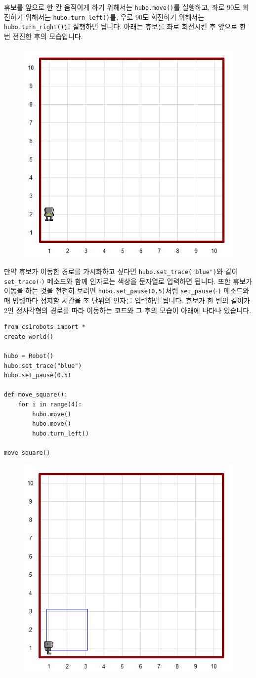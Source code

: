 \documentclass[../main.tex]{subfiles}
\begin{document}
휴보를 앞으로 한 칸 움직이게 하기 위해서는 \texttt{hubo.move()}를 실행하고, 좌로 90도 회전하기 위해서는 \texttt{hubo.turn\_left()}를, 우로 90도 회전하기 위해서는 \texttt{hubo.turn\_right()}를 실행하면 됩니다.
아래는 휴보를 좌로 회전시킨 후 앞으로 한 번 전진한 후의 모습입니다.
\begin{figure}[H]
\centering
\includegraphics[width=0.5\linewidth]{"./lectures/lecture4_huboleftmove"}
\label{fig:lecture4huboleftmove}
\end{figure}

만약 휴보가 이동한 경로를 가시화하고 싶다면 \texttt{hubo.set\_trace("blue")}와 같이 \texttt{set\_trace($\cdot$)} 메소드와 함께 인자로는 색상을 문자열로 입력하면 됩니다.
또한 휴보가 이동을 하는 것을 천천히 보려면 \texttt{hubo.set\_pause(0.5)}처럼 \texttt{set\_pause($\cdot$)} 메소드와 매 명령마다 정지할 시간을 초 단위의 인자를 입력하면 됩니다.
휴보가 한 변의 길이가 2인 정사각형의 경로를 따라 이동하는 코드와 그 후의 모습이 아래에 나타나 있습니다.
\begin{verbatim}
from cs1robots import *
create_world()

hubo = Robot()
hubo.set_trace("blue")
hubo.set_pause(0.5)

def move_square():
	for i in range(4):
		hubo.move()
		hubo.move()
		hubo.turn_left()

move_square()
\end{verbatim}
\begin{figure}[H]
\centering
\includegraphics[width=0.5\linewidth]{"./lectures/lecture4_hubosquare"}
\label{fig:lecture4hubosquare}
\end{figure}
\end{document}
